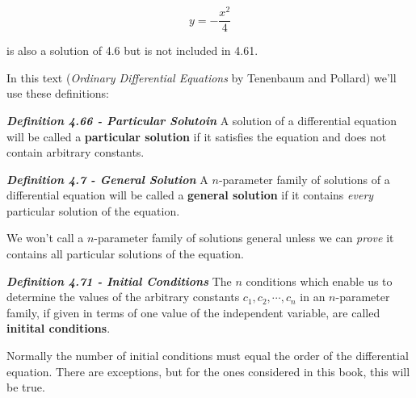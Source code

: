 \documentclass{article}
\begin{document}
\[ y = - \frac{x^2}{4} \tag{4.62} \]

is also a solution of 4.6 but is not included in 4.61.

In this text (\emph{Ordinary Differential Equations} by Tenenbaum and Pollard) we'll use these definitions:

\emph{\textbf{Definition 4.66 - Particular Solutoin}}
A solution of a differential equation will be called a \textbf{particular solution} if it satisfies the equation and does not contain arbitrary constants.

\emph{\textbf{Definition 4.7 - General Solution}}
A $n$-parameter family of solutions of a differential equation will be called a \textbf{general solution} if it contains \emph{every} particular solution of the equation.

We won't call a $n$-parameter family of solutions general unless we can \emph{prove} it contains all particular solutions of the equation.

\emph{\textbf{Definition 4.71 - Initial Conditions}}
The $n$ conditions which enable us to determine the values of the arbitrary constants $c_1,c_2,\cdots,c_n$ in an $n$-parameter family, if given in terms of one value of the independent variable, are called \textbf{initital conditions}.

Normally the number of initial conditions must equal the order of the differential equation. There are exceptions, but for the ones considered in this book, this will be true.
\end{document}
